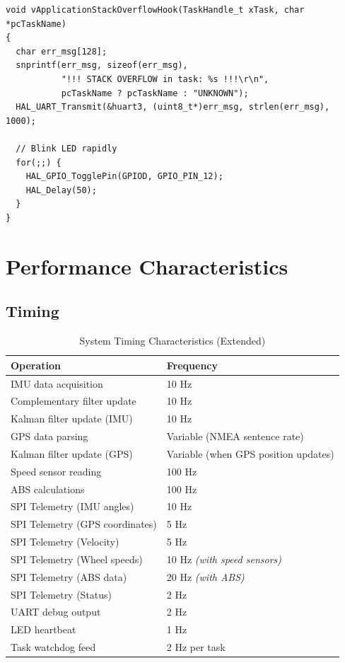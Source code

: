 \documentclass[11pt,a4paper]{article}
\begin{document}
\begin{lstlisting}[caption=Stack Overflow Hook, label=lst:stackoverflow]
void vApplicationStackOverflowHook(TaskHandle_t xTask, char *pcTaskName)
{
  char err_msg[128];
  snprintf(err_msg, sizeof(err_msg), 
           "!!! STACK OVERFLOW in task: %s !!!\r\n", 
           pcTaskName ? pcTaskName : "UNKNOWN");
  HAL_UART_Transmit(&huart3, (uint8_t*)err_msg, strlen(err_msg), 1000);
  
  // Blink LED rapidly
  for(;;) {
    HAL_GPIO_TogglePin(GPIOD, GPIO_PIN_12);
    HAL_Delay(50);
  }
}
\end{lstlisting}

\section{Performance Characteristics}

\subsection{Timing}
\begin{table}[H]
\centering
\begin{tabular}{@{}ll@{}}
\toprule
\textbf{Operation} & \textbf{Frequency} \\
\midrule
IMU data acquisition & 10 Hz \\
Complementary filter update & 10 Hz \\
Kalman filter update (IMU) & 10 Hz \\
GPS data parsing & Variable (NMEA sentence rate) \\
Kalman filter update (GPS) & Variable (when GPS position updates) \\
Speed sensor reading & 100 Hz \\
ABS calculations & 100 Hz \\
SPI Telemetry (IMU angles) & 10 Hz \\
SPI Telemetry (GPS coordinates) & 5 Hz \\
SPI Telemetry (Velocity) & 5 Hz \\
SPI Telemetry (Wheel speeds) & 10 Hz \textit{(with speed sensors)} \\
SPI Telemetry (ABS data) & 20 Hz \textit{(with ABS)} \\
SPI Telemetry (Status) & 2 Hz \\
UART debug output & 2 Hz \\
LED heartbeat & 1 Hz \\
Task watchdog feed & 2 Hz per task \\
\bottomrule
\end{tabular}
\caption{System Timing Characteristics (Extended)}
\end{table}
\end{document}
